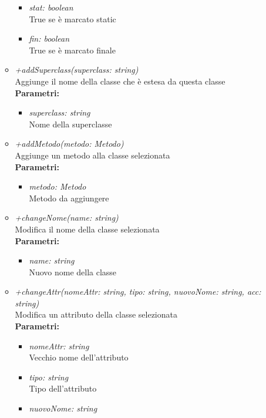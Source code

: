 \begin{itemize}
\begin{itemize}
\begin{itemize}
    			\item \emph{stat: boolean}\\
    			True se è marcato static
    			\item \emph{fin: boolean}\\
    			True se è marcato finale
    		\end{itemize}
    		\item \emph{+addSuperclass(superclass: string)}\\
    		Aggiunge il nome della classe che è estesa da questa classe\\
    		\textbf{Parametri:}
    		\begin{itemize}
    			\item \emph{superclass: string}\\
    			Nome della superclasse
    		\end{itemize}
    		\item \emph{+addMetodo(metodo: Metodo) }\\
    		Aggiunge un metodo alla classe selezionata\\
    		\textbf{Parametri:}
    		\begin{itemize}
    			\item \emph{metodo: Metodo}\\
    			Metodo da aggiungere
    		\end{itemize}
    		\item \emph{+changeNome(name: string)}\\
    		Modifica il nome della classe selezionata\\
    		\textbf{Parametri:}
    		\begin{itemize}
    			\item \emph{name: string}\\
    			Nuovo nome della classe
    		\end{itemize}
    		\item \emph{+changeAttr(nomeAttr: string, tipo: string, nuovoNome: string, acc: string)}\\
    		Modifica un attributo della classe selezionata\\
    		\textbf{Parametri:}
    		\begin{itemize}
    			\item \emph{nomeAttr: string}\\
    			Vecchio nome dell'attributo
    			\item \emph{tipo: string}\\
    			Tipo dell'attributo
    			\item \emph{nuovoNome: string}\\

\end{itemize}
\end{itemize}
\end{itemize}
